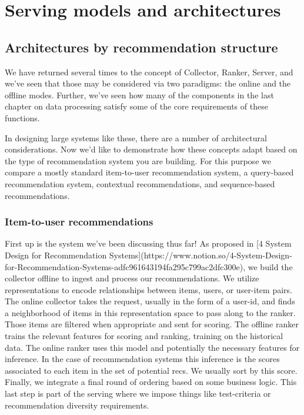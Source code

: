 \chapter{Serving models and architectures}
\label{ch:serving-and-architecture}

\section{Architectures by recommendation structure}

We have returned several times to the concept of Collector, Ranker, Server, and we've seen that those may be considered via two paradigms: the online and the offline modes. Further, we've seen how many of the components in the last chapter on data processing satisfy some of the core requirements of these functions.

In designing large systems like these, there are a number of architectural considerations. Now we'd like to demonstrate how these concepts adapt based on the type of recommendation system you are building. For this purpose we compare a mostly standard item-to-user recommendation system, a query-based recommendation system, contextual recommendations, and sequence-based recommendations.

\subsection{Item-to-user recommendations}

First up is the system we've been discussing thus far! As proposed in [4 System Design for Recommendation Systems](https://www.notion.so/4-System-Design-for-Recommendation-Systems-adfc961643194fa295c799ac2dfc300e), we build the collector offline to ingest and process our recommendations. We utilize representations to encode relationships between items, users, or user-item pairs. The online collector takes the request, usually in the form of a user-id, and finds a neighborhood of items in this representation space to pass along to the ranker. Those items are filtered when appropriate and sent for scoring. The offline ranker trains the relevant features for scoring and ranking, training on the historical data. The online ranker uses this model and potentially the necessary features for inference. In the case of recommendation systems this inference is the scores associated to each item in the set of potential recs. We usually sort by this score. Finally, we integrate a final round of ordering based on some business logic. This last step is part of the serving where we impose things like test-criteria or recommendation diversity requirements.

